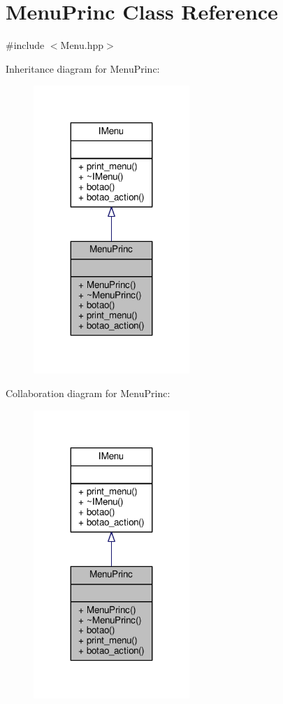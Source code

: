 \hypertarget{class_menu_princ}{}\section{Menu\+Princ Class Reference}
\label{class_menu_princ}


{\ttfamily \#include $<$Menu.\+hpp$>$}



Inheritance diagram for Menu\+Princ\+:\nopagebreak
\begin{figure}[H]
\begin{center}
\leavevmode
\includegraphics[width=167pt]{class_menu_princ__inherit__graph}
\end{center}
\end{figure}


Collaboration diagram for Menu\+Princ\+:\nopagebreak
\begin{figure}[H]
\begin{center}
\leavevmode
\includegraphics[width=167pt]{class_menu_princ__coll__graph}
\end{center}
\end{figure}
